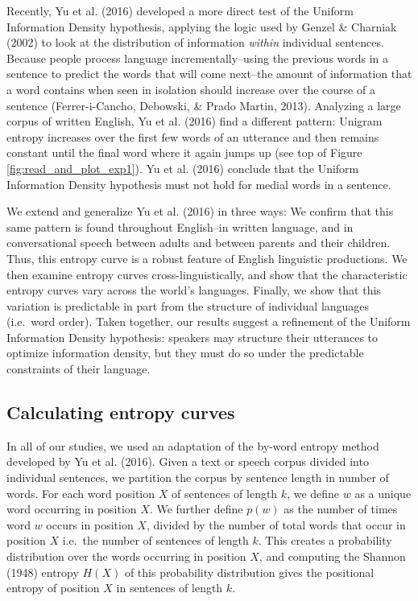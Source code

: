\documentclass[10pt, letterpaper]{article}
\begin{document}
Recently, Yu et al. (2016) developed a more direct test of the Uniform
Information Density hypothesis, applying the logic used by Genzel \&
Charniak (2002) to look at the distribution of information \emph{within}
individual sentences. Because people process language
incrementally--using the previous words in a sentence to predict the
words that will come next--the amount of information that a word
contains when seen in isolation should increase over the course of a
sentence (Ferrer-i-Cancho, Debowski, \& Prado Martin, 2013). Analyzing a
large corpus of written English, Yu et al. (2016) find a different
pattern: Unigram entropy increases over the first few words of an
utterance and then remains constant until the final word where it again
jumps up (see top of Figure \ref{fig:read_and_plot_exp1}). Yu et al.
(2016) conclude that the Uniform Information Density hypothesis must not
hold for medial words in a sentence.

We extend and generalize Yu et al. (2016) in three ways: We confirm that
this same pattern is found throughout English--in written language, and
in conversational speech between adults and between parents and their
children. Thus, this entropy curve is a robust feature of English
linguistic productions. We then examine entropy curves
cross-linguistically, and show that the characteristic entropy curves
vary across the world's languages. Finally, we show that this variation
is predictable in part from the structure of individual languages
(i.e.~word order). Taken together, our results suggest a refinement of
the Uniform Information Density hypothesis: speakers may structure their
utterances to optimize information density, but they must do so under
the predictable constraints of their language.

\subsection{Calculating entropy
curves}\label{calculating-entropy-curves}

In all of our studies, we used an adaptation of the by-word entropy
method developed by Yu et al. (2016). Given a text or speech corpus
divided into individual sentences, we partition the corpus by sentence
length in number of words. For each word position \(X\) of sentences of
length \(k\), we define \(w\) as a unique word occurring in position
\(X\). We further define \(p(w)\) as the number of times word \(w\)
occurs in position \(X\), divided by the number of total words that
occur in position \(X\) i.e.~the number of sentences of length \(k\).
This creates a probability distribution over the words occurring in
position \(X\), and computing the Shannon (1948) entropy \(H(X)\) of
this probability distribution gives the positional entropy of position
\(X\) in sentences of length \(k\).
\end{document}

